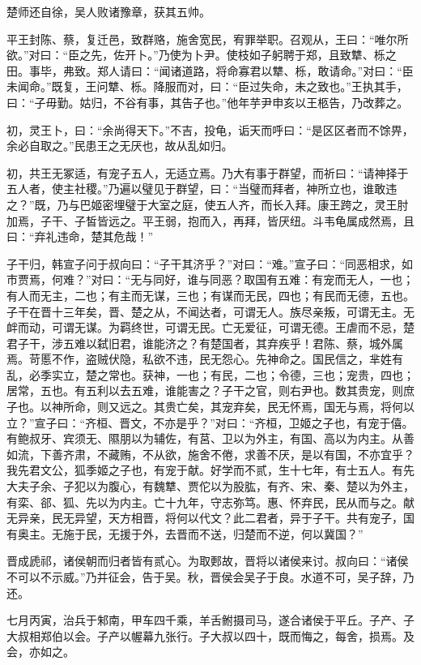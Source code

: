 \documentclass[]{article}
\begin{document}
楚师还自徐，吴人败诸豫章，获其五帅。

平王封陈、蔡，复迁邑，致群赂，施舍宽民，宥罪举职。召观从，王曰：``唯尔所欲。''对曰：``臣之先，佐开卜。''乃使为卜尹。使枝如子躬聘于郑，且致犨、栎之田。事毕，弗致。郑人请曰：``闻诸道路，将命寡君以犨、栎，敢请命。''对曰：``臣未闻命。''既复，王问犨、栎。降服而对，曰：``臣过失命，未之致也。''王执其手，曰：``子毋勤。姑归，不谷有事，其告子也。''他年芋尹申亥以王柩告，乃改葬之。

初，灵王卜，曰：``余尚得天下。''不吉，投龟，诟天而呼曰：``是区区者而不馀畀，余必自取之。''民患王之无厌也，故从乱如归。

初，共王无冢适，有宠子五人，无适立焉。乃大有事于群望，而祈曰：``请神择于五人者，使主社稷。''乃遍以璧见于群望，曰：``当璧而拜者，神所立也，谁敢违之？''既，乃与巴姬密埋璧于大室之庭，使五人齐，而长入拜。康王跨之，灵王肘加焉，子干、子皙皆远之。平王弱，抱而入，再拜，皆厌纽。斗韦龟属成然焉，且曰：``弃礼违命，楚其危哉！''

子干归，韩宣子问于叔向曰：``子干其济乎？''对曰：``难。''宣子曰：``同恶相求，如市贾焉，何难？''对曰：``无与同好，谁与同恶？取国有五难：有宠而无人，一也；有人而无主，二也；有主而无谋，三也；有谋而无民，四也；有民而无德，五也。子干在晋十三年矣，晋、楚之从，不闻达者，可谓无人。族尽亲叛，可谓无主。无衅而动，可谓无谋。为羁终世，可谓无民。亡无爱征，可谓无德。王虐而不忌，楚君子干，涉五难以弑旧君，谁能济之？有楚国者，其弃疾乎！君陈、蔡，城外属焉。苛慝不作，盗贼伏隐，私欲不违，民无怨心。先神命之。国民信之，芈姓有乱，必季实立，楚之常也。获神，一也；有民，二也；令德，三也；宠贵，四也；居常，五也。有五利以去五难，谁能害之？子干之官，则右尹也。数其贵宠，则庶子也。以神所命，则又远之。其贵亡矣，其宠弃矣，民无怀焉，国无与焉，将何以立？''宣子曰：``齐桓、晋文，不亦是乎？''对曰：``齐桓，卫姬之子也，有宠于僖。有鲍叔牙、宾须无、隰朋以为辅佐，有莒、卫以为外主，有国、高以为内主。从善如流，下善齐肃，不藏贿，不从欲，施舍不倦，求善不厌，是以有国，不亦宜乎？我先君文公，狐季姬之子也，有宠于献。好学而不贰，生十七年，有士五人。有先大夫子余、子犯以为腹心，有魏犨、贾佗以为股肱，有齐、宋、秦、楚以为外主，有栾、郤、狐、先以为内主。亡十九年，守志弥笃。惠、怀弃民，民从而与之。献无异亲，民无异望，天方相晋，将何以代文？此二君者，异于子干。共有宠子，国有奥主。无施于民，无援于外，去晋而不送，归楚而不逆，何以冀国？''

晋成虒祁，诸侯朝而归者皆有贰心。为取郠故，晋将以诸侯来讨。叔向曰：``诸侯不可以不示威。''乃并征会，告于吴。秋，晋侯会吴子于良。水道不可，吴子辞，乃还。

七月丙寅，治兵于邾南，甲车四千乘，羊舌鲋摄司马，遂合诸侯于平丘。子产、子大叔相郑伯以会。子产以幄幕九张行。子大叔以四十，既而悔之，每舍，损焉。及会，亦如之。
\end{document}

